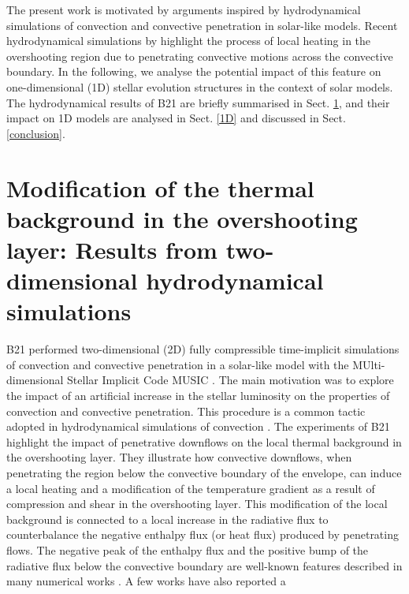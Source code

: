 \documentclass[traditabstract]{aa}
\newcommand{\3}{\ss}
\newcommand{\cp}{\citep}
\newcommand{\ct}{\citet}
\begin{document}
The present work is motivated by arguments inspired by hydrodynamical simulations of convection and convective penetration in solar-like models. Recent hydrodynamical simulations by \ct[][hereafter B21]{baraffe21} highlight the process of 
 local heating in the overshooting region due to penetrating convective motions across the convective boundary. In the following, we analyse the potential impact of this feature on one-dimensional (1D) stellar evolution structures in the context of solar models. The hydrodynamical results of B21 are briefly summarised in Sect. \ref{hydro}, and their impact on 1D models are  analysed in Sect. \ref{1D} and discussed in Sect. \ref{conclusion}.

\section{Modification of the thermal background in the overshooting layer: Results from two-dimensional hydrodynamical simulations}
\label{hydro}
B21  performed two-dimensional (2D) fully compressible time-implicit simulations of convection and convective penetration in a solar-like model with the MUlti-dimensional Stellar Implicit Code MUSIC \cp[][]{viallet11, viallet16, goffrey17}. The main motivation was to explore the impact of an artificial increase in the stellar luminosity on the properties of convection and convective penetration. This procedure is a common tactic adopted in hydrodynamical simulations of convection \cp[][]{rogers06, meakin07, brun11, hotta17, edelmann19}. The experiments of B21 highlight the impact of 
penetrative downflows on the local thermal background in the overshooting layer.  They illustrate how convective downflows, when penetrating the region below the convective boundary of the envelope, can induce a local heating and a modification of the temperature gradient as a result of compression and shear in the overshooting layer. This modification of the local background is connected to a local increase in the radiative flux to counterbalance the negative enthalpy flux (or heat flux) produced by penetrating flows. The negative peak of the enthalpy flux and the positive bump of  the radiative flux  below the convective boundary are well-known features described in many numerical works  \cp[][]{hurlburt86, muthsam95, brummell02,brun11,  hotta17, kapyla19, cai20}. A few works \cp[][]{rogers06, viallet13, korre19, higl21} have also reported a 
\end{document}

